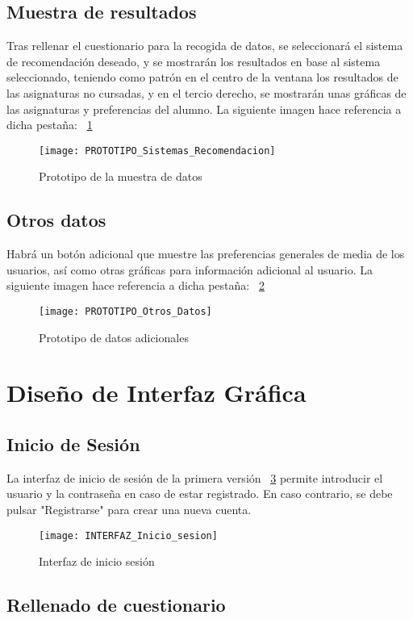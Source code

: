 \subsection{Muestra de resultados}
Tras rellenar el cuestionario para la recogida de datos, se seleccionará el sistema de recomendación deseado, y se mostrarán los resultados en base al sistema seleccionado, teniendo como patrón en el centro de la ventana los resultados de las asignaturas no cursadas, y en el tercio derecho, se mostrarán unas gráficas de las asignaturas y preferencias del alumno. La siguiente imagen hace referencia a dicha pestaña: ~\ref{fig:C.2.3}
\begin{figure}[h]
\centering
\texttt{[image: PROTOTIPO\_Sistemas\_Recomendacion]}
\caption{Prototipo de la muestra de datos}
\label{fig:C.2.3}
\end{figure}

\subsection{Otros datos}
Habrá un botón adicional que muestre las preferencias generales de media de los usuarios, así como otras gráficas para información adicional al usuario. 
La siguiente imagen hace referencia a dicha pestaña: ~\ref{fig:C.2.4}
\begin{figure}[h]
\centering
\texttt{[image: PROTOTIPO\_Otros\_Datos]}
\caption{Prototipo de datos adicionales}
\label{fig:C.2.4}
\end{figure}

\section{Diseño de Interfaz Gráfica }
\subsection{Inicio de Sesión}
La interfaz de inicio de sesión de la primera versión ~\ref{fig:C.3.1}  permite introducir el usuario y la contraseña en caso de estar registrado. En caso contrario, se debe pulsar "Registrarse" para crear una nueva cuenta. 
\begin{figure}[h]
\centering
\texttt{[image: INTERFAZ\_Inicio\_sesion]}
\caption{Interfaz de inicio sesión}
\label{fig:C.3.1}
\end{figure}

\subsection{Rellenado de cuestionario}
